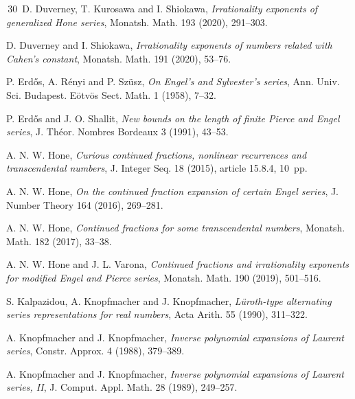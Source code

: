 \documentclass[12pt,a4paper]{amsart}
\theoremstyle{definition}
\numberwithin{equation}{section}
\begin{document}
\begin{thebibliography}{\,30\,}
D. Duverney, T. Kurosawa and I. Shiokawa,
\textit{Irrationality exponents of generalized Hone series},
Monatsh. Math. {193} (2020), 291--303. 

D. Duverney and I. Shiokawa, 
\textit{Irrationality exponents of numbers related with Cahen's constant}, 
Monatsh. Math. {191} (2020), 53--76.

P. Erd\H{o}s, A. R\'{e}nyi and P. Sz\"{u}sz,
\textit{On Engel's and Sylvester's series}, 
Ann. Univ. Sci. Budapest. E\"otv\"os Sect. Math. {1} (1958), 7--32.

P. Erd\H{o}s and J. O. Shallit, 
\textit{New bounds on the length of finite Pierce and Engel series}, 
J. Th\'eor. Nombres Bordeaux {3} (1991), 43--53.

A. N. W. Hone, 
\textit{Curious continued fractions, nonlinear recurrences and transcendental numbers}, 
J. Integer Seq. {18} (2015), article 15.8.4, 10~pp.

A. N. W. Hone, 
\textit{On the continued fraction expansion of certain Engel series}, 
J. Number Theory {164} (2016), 269--281.

A. N. W. Hone, 
\textit{Continued fractions for some transcendental numbers}, 
Monatsh. Math. {182} (2017), 33--38.

A. N. W. Hone and J. L. Varona,
\textit{Continued fractions and irrationality exponents for modified Engel and Pierce series},
Monatsh. Math. {190} (2019), 501--516.

S. Kalpazidou, A. Knopfmacher and J. Knopfmacher, 
\textit{L\"uroth-type alternating series representations for real numbers}, 
Acta Arith. {55} (1990), 311--322.

A. Knopfmacher and J. Knopfmacher,
\textit{Inverse polynomial expansions of Laurent series},
Constr. Approx. {4} (1988), 379--389.

A. Knopfmacher and J. Knopfmacher, 
\textit{Inverse polynomial expansions of Laurent series, II}, 
J. Comput. Appl. Math. {28} (1989), 249--257.



\end{thebibliography}
\end{document}
